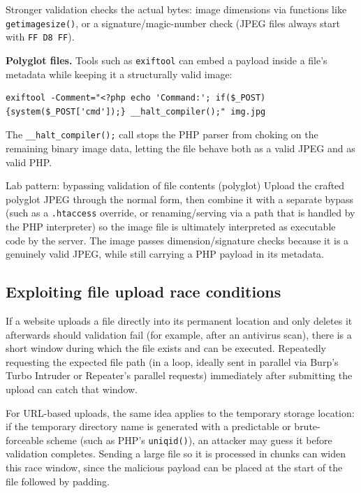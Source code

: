 \documentclass[11pt]{article}
\begin{document}
Stronger validation checks the actual bytes: image dimensions via functions like \texttt{getimagesize()}, or a signature/magic-number check (JPEG files always start with \texttt{FF D8 FF}).

\textbf{Polyglot files.} Tools such as \texttt{exiftool} can embed a payload inside a file's metadata while keeping it a structurally valid image:
\begin{lstlisting}
exiftool -Comment="<?php echo 'Command:'; if($_POST){system($_POST['cmd']);} __halt_compiler();" img.jpg
\end{lstlisting}
The \texttt{\_\_halt\_compiler();} call stops the PHP parser from choking on the remaining binary image data, letting the file behave both as a valid JPEG and as valid PHP.

\begin{labbox}{Lab pattern: bypassing validation of file contents (polyglot)}
Upload the crafted polyglot JPEG through the normal form, then combine it with a separate bypass (such as a \texttt{.htaccess} override, or renaming/serving via a path that is handled by the PHP interpreter) so the image file is ultimately interpreted as executable code by the server. The image passes dimension/signature checks because it is a genuinely valid JPEG, while still carrying a PHP payload in its metadata.
\end{labbox}

\subsection{Exploiting file upload race conditions}
 
If a website uploads a file directly into its permanent location and only deletes it afterwards should validation fail (for example, after an antivirus scan), there is a short window during which the file exists and can be executed. Repeatedly requesting the expected file path (in a loop, ideally sent in parallel via Burp's Turbo Intruder or Repeater's parallel requests) immediately after submitting the upload can catch that window.
 
For URL-based uploads, the same idea applies to the temporary storage location: if the temporary directory name is generated with a predictable or brute-forceable scheme (such as PHP's \texttt{uniqid()}), an attacker may guess it before validation completes. Sending a large file so it is processed in chunks can widen this race window, since the malicious payload can be placed at the start of the file followed by padding.
 
\end{document}
